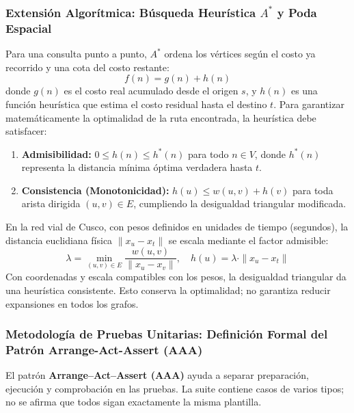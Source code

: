 \subsubsection{Extensión Algorítmica: Búsqueda Heurística $A^*$ y Poda Espacial}
Para una consulta punto a punto, $A^*$ \parencite{hart1968formal} ordena los vértices según el costo ya recorrido y una cota del costo restante:
\begin{equation}
    f(n) = g(n) + h(n)
\end{equation}
donde $g(n)$ es el costo real acumulado desde el origen $s$, y $h(n)$ es una función heurística que estima el costo residual hasta el destino $t$. Para garantizar matemáticamente la optimalidad de la ruta encontrada, la heurística debe satisfacer:
\begin{enumerate}
    \item \textbf{Admisibilidad:} $0 \le h(n) \le h^*(n)$ para todo $n \in V$, donde $h^*(n)$ representa la distancia mínima óptima verdadera hasta $t$.
    \item \textbf{Consistencia (Monotonicidad):} $h(u) \le w(u, v) + h(v)$ para toda arista dirigida $(u, v) \in E$, cumpliendo la desigualdad triangular modificada.
\end{enumerate}
En la red vial de Cusco, con pesos definidos en unidades de tiempo (segundos), la distancia euclidiana física $\|x_u - x_t\|$ se escala mediante el factor admisible:
\begin{equation}
    \lambda = \min_{(u,v) \in E} \frac{w(u,v)}{\|x_u - x_v\|}, \quad h(u) = \lambda \cdot \|x_u - x_t\|
\end{equation}
Con coordenadas y escala compatibles con los pesos, la desigualdad triangular da una heurística consistente. Esto conserva la optimalidad; no garantiza reducir expansiones en todos los grafos.

\subsubsection{Metodología de Pruebas Unitarias: Definición Formal del Patrón Arrange-Act-Assert (AAA)}
\label{sec:fundamentos_aaa}
El patrón \textbf{Arrange--Act--Assert (AAA)} ayuda a separar preparación, ejecución y comprobación en las pruebas. La suite contiene casos de varios tipos; no se afirma que todos sigan exactamente la misma plantilla.

